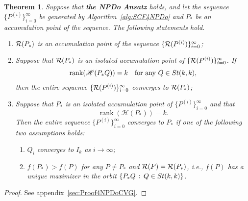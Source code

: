 \documentclass[11pt]{article}
\def\scrH{\mathscr{H}}
\def\cR{{\cal R}}
\newcommand\STM[2]{{\rm St}(#1,#2)}
\DeclareMathOperator{\rank}{rank}
\newtheorem{theorem}{Theorem}[section]
\theoremstyle{definition}
\numberwithin{equation}{section}
\begin{document}
\begin{theorem}\label{thm:cvg4SCF4NPDo'}
Suppose that {\bf the NPDo Ansatz} holds, and let the sequence $\{P^{(i)}\}_{i=0}^{\infty}$ be generated by Algorithm~\ref{alg:SCF4NPDo} and $P_*$ be an accumulation
point of the sequence.
The following statements hold.
\begin{enumerate}[{\rm (a)}]
  \item $\cR(P_*)$ is an accumulation point of the sequence $\{\cR(P^{(i)})\}_{i=0}^{\infty}$;
  \item Suppose that $\cR(P_*)$ is an isolated accumulation point of $\{\cR(P^{(i)})\}_{i=0}^{\infty}$. If
        \begin{equation}\label{eq:full-rank:assume}
        \rank(\scrH(P_*Q))=k\quad\mbox{for any $Q\in\STM{k}{k}$},
        \end{equation}
        then
        the entire sequence $\{\cR(P^{(i)})\}_{i=0}^{\infty}$ converges to $\cR(P_*)$;
  \item %
        Suppose that $P_*$ is an isolated accumulation point of $\{P^{(i)}\}_{i=0}^{\infty}$ and that
        \begin{equation}\label{eq:full-rank:assume'}
        \rank(\scrH(P_*))=k.
        \end{equation}
        Then the entire sequence $\{P^{(i)}\}_{i=0}^{\infty}$ converges to $P_*$ if one of the following
        two assumptions holds:
        \begin{enumerate}[{\rm (c1)}]
          \item $Q_i$ converges to $I_k$ as $i\to\infty$;
          \item $f(P_*)>f(P)$ for any $P\ne P_*$ and $\cR(P)=\cR(P_*)$, i.e.,
                $f(P)$ has a unique maximizer in the orbit $\{P_*Q\,:\,Q\in\STM{k}{k}\}$.
        \end{enumerate}
\end{enumerate}
\end{theorem}

\begin{proof}
See appendix~\ref{sec:Proof4NPDoCVG}.
\end{proof}
\end{document}
